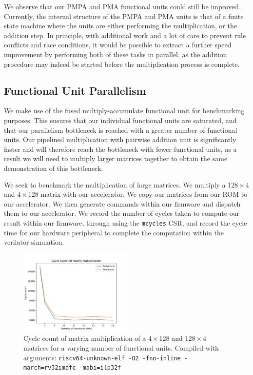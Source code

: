 \documentclass[a4paper,8pt]{report}
\begin{document}
We observe that our PMPA and PMA functional units could still be improved.
Currently, the internal structure of the PMPA and PMA units is that of a finite
state machine where the units are either performing the multiplication, or the
addition step. In principle, with additional work and a lot of care to prevent
rule conflicts and race conditions, it would be possible to extract a further
speed improvement by performing both of these tasks in parallel, as the addition
procedure may indeed be started before the multiplication process is complete.

\subsection{Functional Unit Parallelism}
We make use of the fused multiply-accumulate functional unit for benchmarking
purposes. This ensures that our individual functional units are saturated, and
that our parallelism bottleneck is reached with a greater number of functional
units. Our pipelined multiplication with pairwise addition unit is significantly
faster and will therefore reach the bottleneck with fewer functional units, as a
result we will need to multiply larger matrices together to obtain the same
demonstration of this bottleneck.

We seek to benchmark the multiplication of large matrices. We multiply a
$128\times 4$ and $4\times 128$ matrix with our accelerator. We copy our
matrices from our ROM to our accelerator. We then generate commands
within our firmware and dispatch them to our accelerator. We record the number
of cycles taken to compute our result within our firmware,
through using the \texttt{mcycles} CSR, and record the cycle time for our
hardware peripheral to complete the computation within the verilator simulation.

\begin{figure}[h]
  \centering
  \includegraphics[width=0.5\textwidth]{./py/c2_fu_unbuf.pdf}
  \caption{Cycle count of matrix multiplication of a $4 \times 128$ and $128
    \times 4$ matrices for a varying number of functional units. Compiled with
    arguments: \texttt{riscv64-unknown-elf -O2 -fno-inline -march=rv32imafc -mabi=ilp32f}}
  \label{fig:c2_fu_unbuf}
\end{figure}
\end{document}
